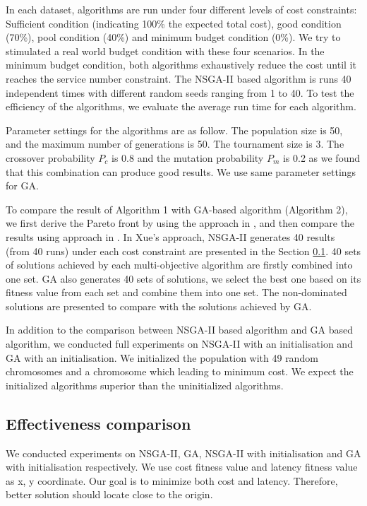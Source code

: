 \documentclass{llncs}
\begin{document}
\begin{flushleft}
\begin{flushleft}
\vspace{-1mm}

In each dataset, algorithms are run under four different levels of cost constraints: Sufficient condition (indicating 100\% the expected total cost), 
good condition (70\%), pool condition (40\%) and minimum budget condition (0\%). We try to stimulated a real world budget condition with these four 
scenarios. In the minimum budget condition, 
both algorithms exhaustively reduce the cost until it reaches the service number constraint. The NSGA-II based algorithm is runs 40 independent times with different random 
seeds ranging from 1 to 40. To test the efficiency of the algorithms, we evaluate the average run time for each algorithm. 


Parameter settings for the algorithms are as follow. The population size is 50, and the maximum number of 
generations is 50. The tournament size is 3. 
The crossover probability $P_{c}$ is 0.8 and the mutation probability $P_{m}$ 
is 0.2 as we found that this combination can produce good results. We use same parameter settings for GA. 

To compare the result of Algorithm 1 with GA-based algorithm (Algorithm 2), we first derive the Pareto front by using the approach in \cite{Xue} \cite{6381531}, and then compare the results using approach in \cite{1688438}.
In Xue's approach, NSGA-II generates 40 results (from 40 runs) under each cost constraint 
are presented in the Section \ref{sec:comparison}. 40 sets of solutions 
achieved by each multi-objective algorithm are firstly combined into one set. GA also generates 40 sets of 
solutions, we select the best one based on its fitness value from each set and combine them into one set. 
The non-dominated solutions are presented to compare with the solutions achieved by GA.

In addition to the comparison between NSGA-II based algorithm and GA based algorithm, we conducted full experiments on NSGA-II with an initialisation and GA with an initialisation.
We initialized the population with 49 random chromosomes and a chromosome which leading to minimum cost. We expect the initialized algorithms superior than
the uninitialized algorithms.

\subsection{Effectiveness comparison}
\label{sec:comparison}
We conducted experiments on NSGA-II, GA, NSGA-II with initialisation and GA with initialisation respectively. We use cost fitness value and latency fitness value as 
x, y coordinate. Our goal is to minimize both cost and latency. Therefore, better solution should locate close to the origin.


\end{flushleft}
\end{flushleft}
\end{document}
